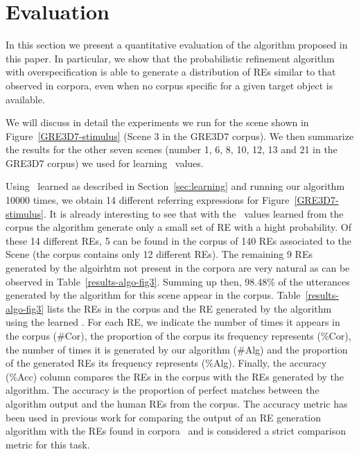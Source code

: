 \section{Evaluation}\label{sec:evaluation}

In this section we present a quantitative evaluation of the algorithm proposed in this paper. 
In particular, we show that the probabilistic refinement algorithm with overspecification is able to generate a distribution of REs similar to that observed in corpora, even when no corpus specific for a given target object is available. 

We will discuss in detail the experiments we run for the scene shown in Figure~\ref{GRE3D7-stimulus} (Scene 3 in the GRE3D7 corpus). We then summarize the results for the other seven scenes (number 1, 6, 8, 10, 12, 13 and 21 in the GRE3D7 corpus) we used for learning \puse\ values. 

Using \puse\ learned as described in Section~\ref{sec:learning} and running 
our algorithm 10000 times, we obtain 14 different referring expressions 
for Figure~\ref{GRE3D7-stimulus}.  It is already interesting to see that with the 
\puse\ values learned from the corpus the algorithm generate only a small set of RE with a hight probability. 
Of these 14 different REs, 5 can be found in the corpus of 140 REs associated to the Scene (the corpus contains only 12 different REs).  
The remaining 9 REs generated by the algoirhtm not present in the corpora are very natural as can be observed in Table~\ref{results-algo-fig3}.
Summing up then, 98.48\% of the utterances generated by the algorithm for this scene appear in the corpus. Table~\ref{results-algo-fig3} lists the REs in the corpus and the RE generated by the algorithm using the learned \puse. For each RE, we indicate the number of times it appears in the corpus (\#Cor), the proportion of the corpus its frequency represents (\%Cor), the number of times it is generated by our algorithm (\#Alg) and the proportion of the generated REs its frequency represents (\%Alg). Finally, the accuracy (\%Acc) column compares the REs in the corpus with the REs generated by the algorithm. The accuracy is the proportion of perfect matches between the algorithm output and the human REs from the corpus. The accuracy metric has been used in previous work for comparing the output of an RE generation algorithm with the REs found in corpora~\cite{sluis07:eval,viet:gene11} and is considered a strict comparison metric for this task. 

